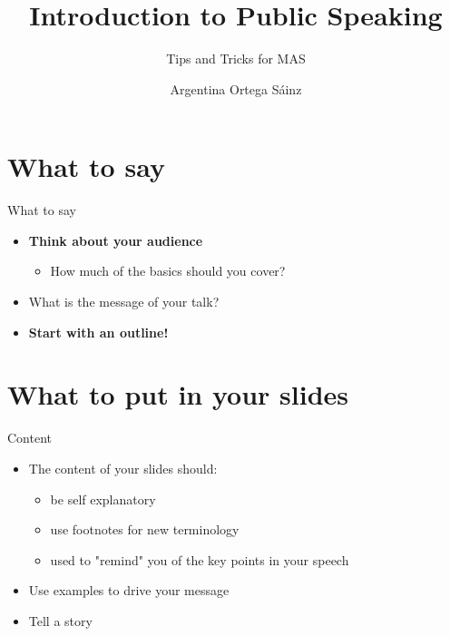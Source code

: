 \documentclass{beamer}
\author[A. Ortega]{Argentina Ortega S\'ainz}
\title{Introduction to Public Speaking}
\subtitle{Tips and Tricks for MAS}
\institute[HBRS]{Hochschule Bonn-Rhein-Sieg}
\begin{document}
{
\begin{frame}
\titlepage
\end{frame}
}

%

\section{What to say}

\begin{frame}[t]{What to say}
    \begin{itemize}
        \item \textbf{Think about your audience}
        \begin{itemize}
            \item How much of the basics should you cover?
        \end{itemize}
        \item What is the message of your talk?
        \item \textbf{Start with an outline!}
    \end{itemize}
\end{frame}


\section{What to put in your slides}
\begin{frame}[t]{Content}
    \begin{itemize}
        \item The content of your slides should:
        \begin{itemize}
            \item be self explanatory
            \item use footnotes for new terminology
            \item used to "remind" you of the key points in your speech
        \end{itemize}
        \item Use examples to drive your message
        \item Tell a story
    \end{itemize}
\end{frame}
\end{document}
